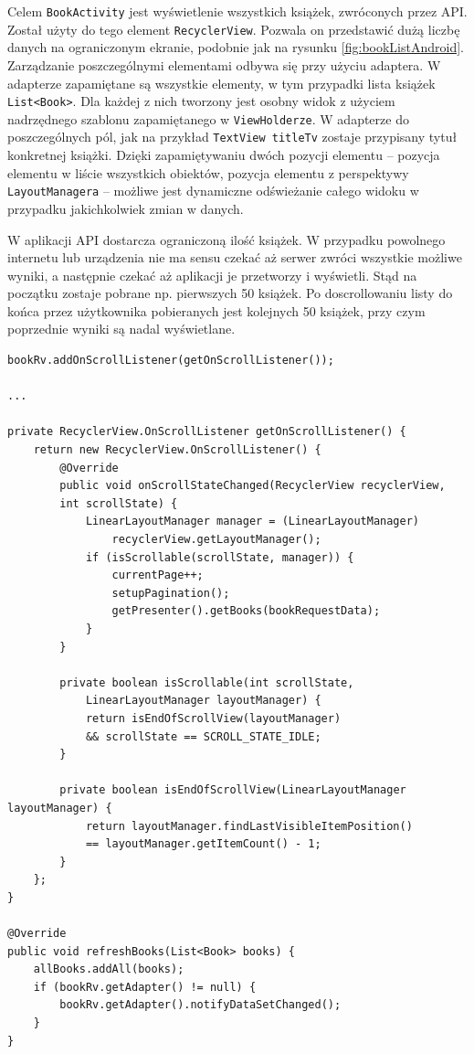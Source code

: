\documentclass[twoside]{projektInzynierskiMS}
\begin{document}
Celem \verb`BookActivity` jest wyświetlenie wszystkich książek, zwróconych przez API. Został użyty do tego element \verb`RecyclerView`. Pozwala on przedstawić dużą liczbę danych na ograniczonym ekranie, podobnie jak na rysunku \ref{fig:bookListAndroid}. Zarządzanie poszczególnymi elementami odbywa się przy użyciu adaptera. W adapterze zapamiętane są wszystkie elementy, w tym przypadki lista książek \verb`List<Book>`. Dla każdej z nich tworzony jest osobny widok z użyciem nadrzędnego szablonu zapamiętanego w \verb`ViewHolderze`. W adapterze do poszczególnych pól, jak na przykład \verb`TextView titleTv` zostaje przypisany tytuł konkretnej książki. Dzięki zapamiętywaniu dwóch pozycji elementu -- pozycja elementu w liście wszystkich obiektów, pozycja elementu z perspektywy \verb`LayoutManagera` -- możliwe jest dynamiczne odświeżanie całego widoku w przypadku jakichkolwiek zmian w danych. 

W aplikacji API dostarcza ograniczoną ilość książek. W przypadku powolnego internetu lub urządzenia nie ma sensu czekać aż serwer zwróci wszystkie możliwe wyniki, a następnie czekać aż aplikacji je przetworzy i wyświetli. Stąd na początku zostaje pobrane np. pierwszych 50 książek. Po doscrollowaniu listy do końca przez użytkownika pobieranych jest kolejnych 50 książek, przy czym poprzednie wyniki są nadal wyświetlane. 

\begin{verbatim}
bookRv.addOnScrollListener(getOnScrollListener());

...

private RecyclerView.OnScrollListener getOnScrollListener() {
    return new RecyclerView.OnScrollListener() {
        @Override
        public void onScrollStateChanged(RecyclerView recyclerView, 
        int scrollState) {
            LinearLayoutManager manager = (LinearLayoutManager)
                recyclerView.getLayoutManager();
            if (isScrollable(scrollState, manager)) {
                currentPage++;
                setupPagination();
                getPresenter().getBooks(bookRequestData);
            }
        }

        private boolean isScrollable(int scrollState, 
            LinearLayoutManager layoutManager) {
            return isEndOfScrollView(layoutManager) 
            && scrollState == SCROLL_STATE_IDLE;
		}

        private boolean isEndOfScrollView(LinearLayoutManager layoutManager) {
            return layoutManager.findLastVisibleItemPosition() 
            == layoutManager.getItemCount() - 1;
        }
    };
}

@Override
public void refreshBooks(List<Book> books) {
    allBooks.addAll(books);
    if (bookRv.getAdapter() != null) {
        bookRv.getAdapter().notifyDataSetChanged();
    }
}
\end{verbatim}
\end{document}
